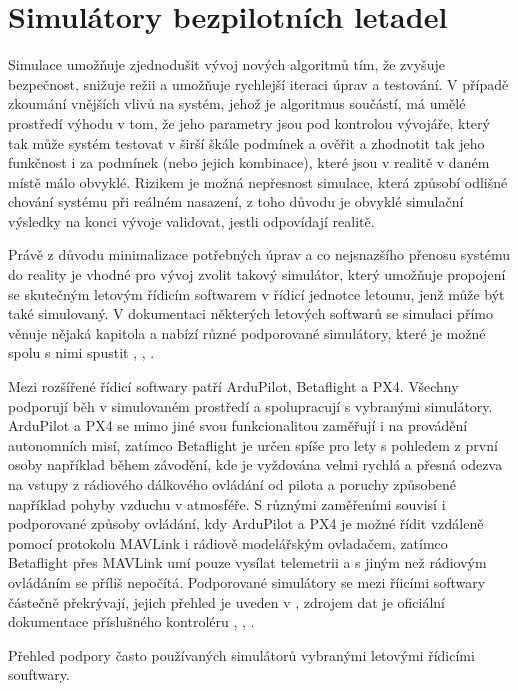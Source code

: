 \chapter{Simulátory bezpilotních letadel} \label{chap:sims}
    Simulace umožňuje zjednodušit vývoj nových algoritmů tím, že zvyšuje bezpečnost, snižuje režii a umožňuje rychlejší iteraci úprav a testování. V případě zkoumání vnějších vlivů na systém, jehož je algoritmus součástí, má umělé prostředí výhodu v tom, že jeho parametry jsou pod kontrolou vývojáře, který tak může systém testovat v širší škále podmínek a ověřit a zhodnotit tak jeho funkčnost i za podmínek (nebo jejich kombinace), které jsou v realitě v daném místě málo obvyklé. Rizikem je možná nepřesnost simulace, která způsobí odlišné chování systému při reálném nasazení, z toho důvodu je obvyklé simulační výsledky na konci vývoje validovat, jestli odpovídají realitě.

    Právě z důvodu minimalizace potřebných úprav a co nejsnazšího přenosu systému do reality je vhodné pro vývoj zvolit takový simulátor, který umožňuje propojení se skutečným letovým řídicím softwarem v řídicí jednotce letounu, jenž může být také simulovaný. V dokumentaci některých letových softwarů se simulaci přímo věnuje nějaká kapitola a nabízí různé podporované simulátory, které je možné spolu s nimi spustit \cite{px4:simulation}, \cite{ardupilot:simulation}, \cite{betaflight:simulation}.

    Mezi rozšířené řídicí softwary patří ArduPilot, Betaflight a PX4. Všechny podporují běh v simulovaném prostředí a spolupracují s vybranými simulátory. ArduPilot a PX4 se mimo jiné svou funkcionalitou zaměřují i na provádění autonomních misí, zatímco Betaflight je určen spíše pro lety s pohledem z první osoby například během závodění, kde je vyždována velmi rychlá a přesná odezva na vstupy z rádiového dálkového ovládání od pilota a poruchy způsobené například pohyby vzduchu v atmosféře. S různými zaměřeními souvisí i podporované způsoby ovládání, kdy ArduPilot a PX4 je možné řídit vzdáleně pomocí protokolu MAVLink i rádiově modelářským ovladačem, zatímco Betaflight přes MAVLink umí pouze vysílat telemetrii a s jiným než rádiovým ovládáním se příliš nepočítá. Podporované simulátory se mezi říicími softwary částečně překrývají, jejich přehled je uveden v , zdrojem dat je oficiální dokumentace příslušného kontroléru \cite{px4:simulation}, \cite{ardupilot:simulation}, \cite{betaflight:simulation}.

    \begin{table}
        \centering
        
        \caption[Simulátory podporované kontrolérem letounu]{Přehled podpory často používaných simulátorů vybranými letovými řídicími souftwary.}
        \label{tab:sims}
    \end{table}

